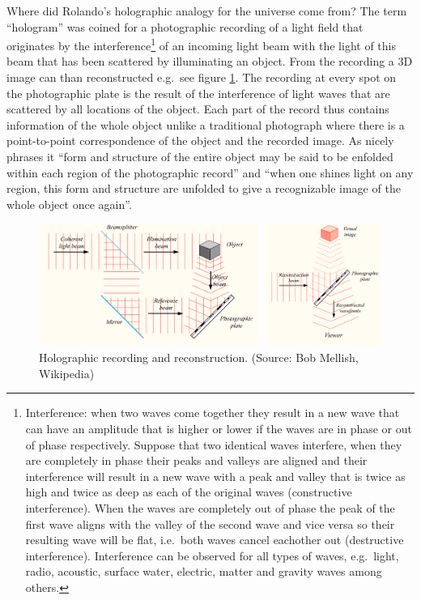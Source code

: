 \documentclass[
  11pt,
]{book}
\begin{document}
Where did Rolando's holographic analogy for the universe come from?
The term ``hologram'' was coined for a photographic recording of a light field that originates by the interference\footnote{Interference: when two waves come together they result in a new wave that can have an amplitude that is higher or lower if the waves are in phase or out of phase respectively. Suppose that two identical waves interfere, when they are completely in phase their peaks and valleys are aligned and their interference will result in a new wave with a peak and valley that is twice as high and twice as deep as each of the original waves (constructive interference). When the waves are completely out of phase the peak of the first wave aligns with the valley of the second wave and vice versa so their resulting wave will be flat, i.e.~both waves cancel eachother out (destructive interference). Interference can be observed for all types of waves, e.g.~light, radio, acoustic, surface water, electric, matter and gravity waves among others.} of an incoming light beam with the light of this beam that has been scattered by illuminating an object.
From the recording a 3D image can than reconstructed e.g.~see figure \ref{fig:hologram1}. The recording at every spot on the photographic plate is the result of the interference of light waves that are scattered by all locations of the object. Each part of the record thus contains information of the whole object unlike a traditional photograph where there is a point-to-point correspondence of the object and the recorded image. As \citet{bohm1980} nicely phrases it ``form and structure of the entire object may be said to be enfolded within each region of the photographic record'' and ``when one shines light on any region, this form and structure are unfolded to give a recognizable image of the whole object once again''.

\begin{figure}

{\centering \includegraphics[width=1\linewidth]{./figs/holographySmall} 

}

\caption{Holographic recording and reconstruction. (Source: Bob Mellish, Wikipedia)}\label{fig:hologram1}
\end{figure}
\end{document}
